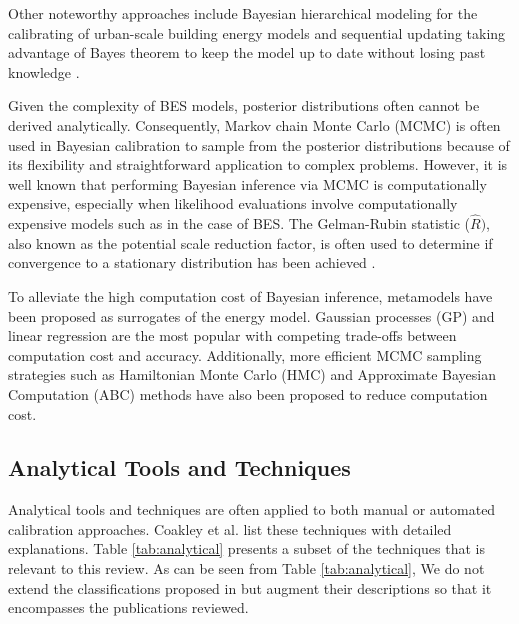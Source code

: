 \documentclass[review]{elsarticle}
\begin{document}
Other noteworthy approaches include Bayesian hierarchical modeling for the calibrating of urban-scale building energy models \cite{kristensen2018hierarchical, kristensen2020long} and sequential updating taking advantage of Bayes theorem to keep the model up to date without losing past knowledge \cite{chong2019continuous, rouchier2019sequential}.

Given the complexity of BES models, posterior distributions often cannot be derived analytically. Consequently, Markov chain Monte Carlo (MCMC) is often used in Bayesian calibration to sample from the posterior distributions because of its flexibility and straightforward application to complex problems. However, it is well known that performing Bayesian inference via MCMC is computationally expensive, especially when likelihood evaluations involve computationally expensive models such as in the case of BES. The Gelman-Rubin statistic ($\hat{R})$, also known as the potential scale reduction factor, is often used to determine if convergence to a stationary distribution has been achieved \cite{kristensen2018hierarchical, lim2017comprehensive, hedegaard2019bottom, chong2017bayesian, chong2018guidelines}.

To alleviate the high computation cost of Bayesian inference, metamodels have been proposed as surrogates of the energy model. Gaussian processes (GP) \cite{martinez2019energy, menberg2019influence, chong2018guidelines, lim2017comprehensive, chong2017bayesian, yuan2017simultaneous, kim2016stepwise, chong2019continuous, chen2019district} and linear regression \cite{lim2018influences, sokol2017validation, li2016assessment, tian2016identifying, tardioli2020methodology} are the most popular with competing trade-offs between computation cost and accuracy.  Additionally, more efficient MCMC sampling strategies such as Hamiltonian Monte Carlo (HMC) \cite{chong2017bayesian, lundstrom2019bayesian} and Approximate Bayesian Computation (ABC) methods \cite{zhu2020uncertainty} have also been proposed to reduce computation cost. 

\subsection{Analytical Tools and Techniques} \label{sec:analytical_tools}

Analytical tools and techniques are often applied to both manual or automated calibration approaches. Coakley et al. \cite{coakley2014review} list these techniques with detailed explanations. Table \ref{tab:analytical} presents a subset of the techniques \cite{coakley2014review} that is relevant to this review. As can be seen from Table \ref{tab:analytical}, We do not extend the classifications proposed in \cite{coakley2014review} but augment their descriptions so that it encompasses the publications reviewed.
\end{document}
